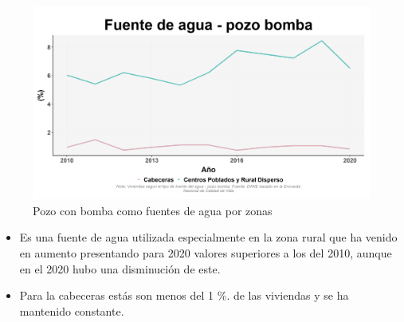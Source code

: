     \begin{figure}[H]
        \caption{Pozo con bomba como fuentes de agua por zonas \label{map_result_2} }
        \begin{center}
        \includegraphics[width=\textwidth,keepaspectratio]{img/var_136_trend.png}
        \end{center}
    \end{figure}
            \begin{itemize}
                    \item Es una fuente de agua utilizada especialmente en la zona rural que ha venido en aumento presentando para 2020 valores superiores a los del 2010, aunque en el 2020 hubo una disminución de este.
                    \item Para la cabeceras estás son menos del 1 \%. de las viviendas y se ha mantenido constante.
                    \end{itemize}

